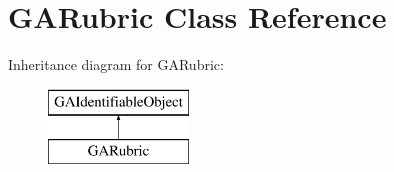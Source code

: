 \hypertarget{class_g_a_rubric}{}\section{G\+A\+Rubric Class Reference}
\label{class_g_a_rubric}
Inheritance diagram for G\+A\+Rubric\+:\begin{figure}[H]
\begin{center}
\leavevmode
\includegraphics[height=2.000000cm]{class_g_a_rubric}
\end{center}
\end{figure}
